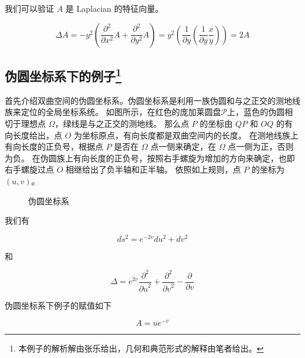 \documentclass[a4paper,12pt]{article}
\numberwithin{definition}{section}
\numberwithin{lemma}{section}
\numberwithin{proposition}{section}
\numberwithin{theorem}{section}
\numberwithin{grammar}{section}
\numberwithin{program}{section}
\numberwithin{convention}{section}
\numberwithin{corollary}{section}
\begin{document}
我们可以验证 $A$ 是 Laplacian 的特征向量。

$$
\Delta A = - y^2 (\frac{\partial^2}{\partial x^2} A + \frac{\partial^2}{\partial y^2} A) = y^2 (\frac{1}{\partial y} (\frac{1}{\partial y} \frac{x}{y})) = 2 A
$$

\subsection{伪圆坐标系下的例子\footnote{本例子的解析解由张乐给出，几何和典范形式的解释由笔者给出。}}
\label{subsec:hc}

首先介绍双曲空间的伪圆坐标系。伪圆坐标系是利用一族伪圆和与之正交的测地线族来定位的全局坐标系统。
如图所示，在红色的庞加莱圆盘$\mathcal{P}$上，蓝色的伪圆相切于理想点 $\Omega$，绿线是与之正交的测地线。
那么点 $P$ 的坐标由 $QP$ 和 $OQ$ 的有向长度给出，点 $O$ 为坐标原点，有向长度都是双曲空间内的长度。
在测地线族上有向长度的正负号，根据点 $P$ 是否在 $\Omega$ 点一侧来确定，在 $\Omega$ 点一侧为正，否则为负。
在伪圆族上有向长度的正负号，按照右手螺旋为增加的方向来确定，也即右手螺旋过点 $O$ 相继给出了负半轴和正半轴。
依照如上规则，点 $P$ 的坐标为 $(u,v)$。

\begin{figure}[ht]
\centering
{}
\caption{伪圆坐标系}\label{fig:horocyclecoord}
\end{figure}

我们有

$$
ds^2 = e^{-2v} du^2 + dv^2
$$

和

$$
\Delta = e^{2v} \frac{\partial^2}{{\partial u}^2} + \frac{\partial^2}{{\partial v}^2} - \frac{\partial}{\partial v}
$$

伪圆坐标系下例子的赋值如下

\begin{equation}
A = u e^{-v}
\end{equation}
\end{document}
